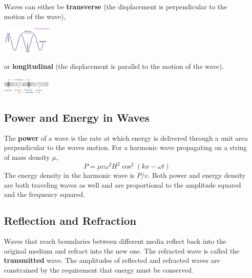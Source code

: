     \newline \indent
    Waves can either be \textbf{transverse} (the displacement is perpendicular to the motion of the wave),
    \begin{center}
        \includegraphics[width=70pt]{transverse.png}
    \end{center}
    or \textbf{longitudinal} (the displacement is parallel to the motion of the wave).
    \begin{center}
        \includegraphics[width=70pt]{longitudinal.jpg}
    \end{center}
    \subsection*{Power and Energy in Waves}
        The \textbf{power} of a wave is the rate at which energy is delivered through a unit area perpendicular to the waves motion. For a harmonic wave propagating on a string of mass density $\mu$,
        \begin{equation*}
            P = \mu v \omega^2 H^2 \cos^2(kx - \omega t)
        \end{equation*}
        The energy density in the harmonic wave is $P / v$. Both power and energy density are both traveling waves as well and are proportional to the amplitude squared and the frequency squared.
    \subsection*{Reflection and Refraction}
        Waves that reach boundaries between different media reflect back into the original medium and refract into the new one. The refracted wave is called the \textbf{transmitted} wave. The amplitudes of reflected and refracted waves are constrained by the requirement that energy must be conserved.
